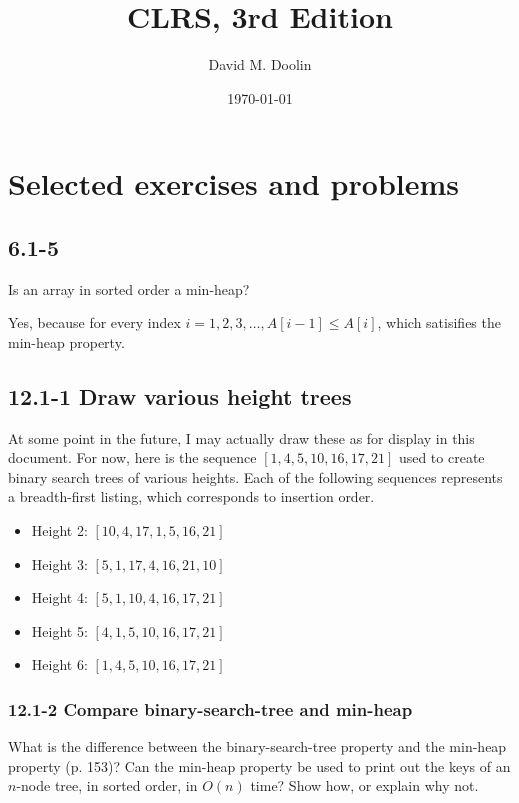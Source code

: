 \documentclass{article}
\title{CLRS, 3rd Edition}
\date{\today}
\author{David M. Doolin}
\begin{document}
\maketitle


\tableofcontents


\section{Selected exercises and problems}



\subsection{6.1-5} Is an array in sorted order a min-heap?

Yes, because for every index $i = 1, 2, 3,\ldots, A[i-1] \leq A[i]$,
which satisifies the min-heap property.

\subsection{12.1-1 Draw various height trees}

At some point in the future, I may actually draw these as for
display in this document. For now, here is the sequence
$[1, 4, 5, 10, 16, 17, 21]$ used to create binary search trees
of various heights. Each of the following sequences represents
a breadth-first listing, which corresponds to insertion order.

\begin{itemize}
  \item Height 2: $[10, 4, 17, 1, 5, 16, 21]$
  \item Height 3: $[5, 1, 17, 4, 16, 21, 10]$
  \item Height 4: $[5, 1, 10, 4, 16, 17, 21]$
  \item Height 5: $[4, 1, 5, 10, 16, 17, 21]$
  \item Height 6: $[1, 4, 5, 10, 16, 17, 21]$
\end{itemize}

\subsubsection{12.1-2 Compare binary-search-tree and min-heap}

What is the difference between the binary-search-tree property and the min-heap
property (p. 153)? Can the min-heap property be used to print out the keys of
an $n$-node tree, in sorted order, in $O(n)$ time?  Show how, or explain why
not.
\end{document}
